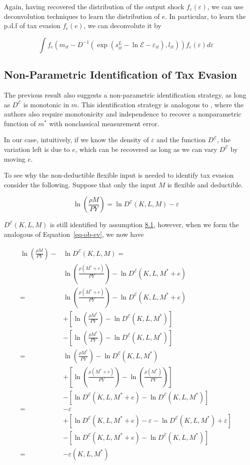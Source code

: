 \documentclass[
  12pt]{article}
\theoremstyle{definition}
\theoremstyle{remark}
\begin{document}
Again, having recovered the distribution of the output shock
\(f_{\varepsilon}(\varepsilon)\), we can use deconvolution techniques to
learn the distribution of \(e\). In particular, to learn the p.d.f of
tax evasion \(f_e(e)\), we can deconvolute it by

\[
    \int f_e(m_{it}-D^{-1}(\exp(s^L_{it}-\ln\mathcal{E}-\varepsilon_{it}),l_{it})) f_{\varepsilon}(\varepsilon)d\varepsilon
\]

\subsection{Non-Parametric Identification of Tax
Evasion}\label{non-parametric-identification-of-tax-evasion}

The previous result also suggests a non-parametric identification
strategy, as long as \(D^{\mathcal{E}}\) is monotonic in \(m\). This
identification strategy is analogous to \citet{Hu2022b}, where the
authors also require monotonicity and independence to recover a
nonparametric function of \(m^*\) with nonclassical measurement error.

In our case, intuitively, if we know the density of \(\varepsilon\) and
the function \(D^{\mathcal{E}}\), the variation left is due to \(e\),
which can be recovered as long as we can vary \(D^{\mathcal{E}}\) by
moving \(e\).

To see why the non-deductible flexible input is needed to identify tax
evasion consider the following. Suppose that only the input \(M\) is
flexible and deductible.

\[
\ln\left(\frac{\rho M}{PY}\right)=\ln D^{\mathcal{E}}(K,L,M)-\varepsilon
\]

\(D^{\mathcal{E}}(K,L,M)\) is still identified by assumption
\hyperref[ass-non-ev]{8.1}, however, when we form the analogous of
Equation~\ref{eq-ob-ev}, we now have

\[
\begin{aligned}
\ln\left(\frac{\rho M}{PY}\right)-&\ln D^{\mathcal{E}}(K,L,M)=\\
&\ln\left(\frac{\rho(M^*+e)}{PY}\right)-\ln D^{\mathcal{E}}(K,L,M^*+e)\\
=&\ln\left(\frac{\rho(M^*+e)}{PY}\right)-\ln D^{\mathcal{E}}(K,L,M^*+e)\\
&+\left[\ln\left(\frac{\rho M^*}{PY}\right)-\ln D^{\mathcal{E}}(K,L,M^*)\right]\\
&-\left[\ln\left(\frac{\rho M^*}{PY}\right)-\ln D^{\mathcal{E}}(K,L,M^*)\right] \\
=&\ln\left(\frac{\rho M^*}{PY}\right)-\ln D^{\mathcal{E}}(K,L,M^*) \\
&+\left[\ln\left(\frac{\rho(M^*+e)}{PY}\right)-\ln\left(\frac{\rho(M^*)}{PY}\right)\right]\\
&-\left[\ln D^{\mathcal{E}}(K,L,M^*+e)-\ln D^{\mathcal{E}}(K,L,M^*)\right]\\
=& -\varepsilon \\
&+\left[\ln D^{\mathcal{E}}(K,L,M^*+e)-\varepsilon-\ln D^{\mathcal{E}}(K,L,M^*)+\varepsilon\right]\\
&-\left[\ln D^{\mathcal{E}}(K,L,M^*+e)-\ln D^{\mathcal{E}}(K,L,M^*)\right]\\
=& -\varepsilon(K,L,M^*)
\end{aligned}
\]
\end{document}
